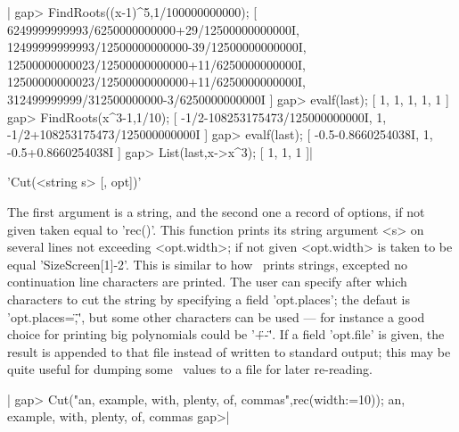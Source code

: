 |    gap> FindRoots((x-1)^5,1/100000000000);
    [ 6249999999993/6250000000000+29/12500000000000I, 
      12499999999993/12500000000000-39/12500000000000I, 
      12500000000023/12500000000000+11/6250000000000I, 
      12500000000023/12500000000000+11/6250000000000I, 
      312499999999/312500000000-3/6250000000000I ]
    gap> evalf(last);
    [ 1, 1, 1, 1, 1 ]
    gap> FindRoots(x^3-1,1/10);            
    [ -1/2-108253175473/125000000000I, 1, -1/2+108253175473/125000000000I ]
    gap> evalf(last);
    [ -0.5-0.8660254038I, 1, -0.5+0.8660254038I ]
    gap> List(last,x->x^3);
    [ 1, 1, 1 ]|


'Cut(<string s> [, opt])'

The  first argument is a string, and the second one a record of options, if
not  given taken equal to 'rec()'. This function prints its string argument
<s> on several lines not exceeding <opt.width>; if not given <opt.width> is
taken  to be equal  'SizeScreen[1]-2'. This is  similar to how \GAP\ prints
strings, excepted no continuation line characters are printed. The user can
specify  after which  characters to  cut the  string by  specifying a field
'opt.places';  the defaut is 'opt.places=\",\"',  but some other characters
can  be used ---  for instance a  good choice for  printing big polynomials
could  be '\"+-\"'. If a field 'opt.file'  is given, the result is appended
to  that file  instead of  written to  standard output;  this may  be quite
useful for dumping some \GAP\ values to a file for later re-reading.

|    gap> Cut("an, example, with, plenty, of, commas\n",rec(width:=10));
    an,
    example,
    with,
    plenty,
    of,
    commas
    gap>|

